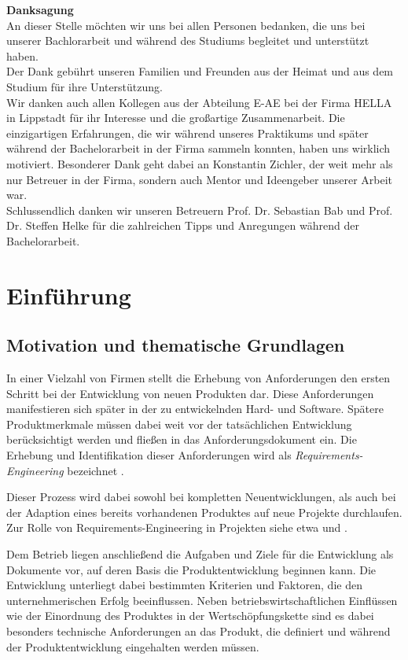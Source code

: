 \documentclass[12pt]{report}
\begin{document}
\thispagestyle{empty}
\textbf{Danksagung}
\vspace{12pt} \\
An dieser Stelle möchten wir uns bei allen Personen bedanken, die uns bei unserer Bachlorarbeit und während des Studiums begleitet und unterstützt haben.
\vspace{12pt} \\
Der Dank gebührt unseren Familien und Freunden aus der Heimat und aus dem Studium für ihre Unterstützung.
\vspace{12pt} \\
Wir danken auch allen Kollegen aus der Abteilung E-AE bei der Firma HELLA in Lippstadt für ihr Interesse und die großartige Zusammenarbeit. Die einzigartigen Erfahrungen, die wir während unseres Praktikums und später während der Bachelorarbeit in der Firma sammeln konnten, haben uns wirklich motiviert. Besonderer Dank geht dabei an Konstantin Zichler, der weit mehr als nur Betreuer in der Firma, sondern auch Mentor und Ideengeber unserer Arbeit war.
\vspace{12pt} \\
Schlussendlich danken wir unseren Betreuern Prof. Dr. Sebastian Bab und Prof. Dr. Steffen Helke für die zahlreichen Tipps und Anregungen während der Bachelorarbeit.
\newpage

\newpage
\chapter{Einführung}
\section[Motivation]{Motivation und thematische Grundlagen}
In einer Vielzahl von Firmen stellt die Erhebung von Anforderungen den ersten Schritt bei der Entwicklung von neuen Produkten dar. Diese Anforderungen manifestieren sich später in der zu entwickelnden Hard- und Software. Spätere Produktmerkmale müssen dabei weit vor der tatsächlichen Entwicklung berücksichtigt werden und fließen in das Anforderungsdokument ein. Die Erhebung und Identifikation dieser Anforderungen wird als \textit{Requirements-Engineering} bezeichnet \cite{bal10}.

Dieser Prozess wird dabei sowohl bei kompletten Neuentwicklungen, als auch bei der Adaption eines bereits vorhandenen Produktes auf neue Projekte durchlaufen. Zur Rolle von Requirements-Engineering in Projekten siehe etwa \cite{mw02} und \cite{hl01}. 

Dem Betrieb liegen anschließend die Aufgaben und Ziele für die Entwicklung als Dokumente vor, auf deren Basis die Produktentwicklung beginnen kann. Die Entwicklung unterliegt dabei bestimmten Kriterien und Faktoren, die den unternehmerischen Erfolg beeinflussen. Neben betriebswirtschaftlichen Einflüssen wie der Einordnung des Produktes in der Wertschöpfungskette sind es dabei besonders technische Anforderungen an das Produkt, die definiert und während der Produktentwicklung eingehalten werden müssen.
\end{document}

